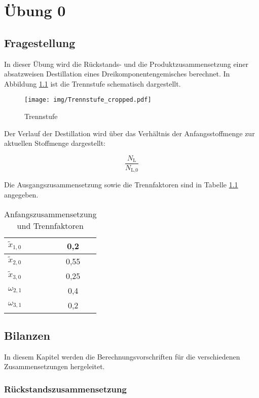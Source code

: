 \chapter{Übung 0}
\setcounter{page}{1}

\section{Fragestellung}
In dieser Übung wird die Rückstands- und die Produktzusammensetzung einer absatzweisen Destillation eines Dreikomponentengemisches berechnet. In Abbildung \ref{fig:Trennstufe} ist die Trennstufe schematisch dargestellt.

\begin{figure}[h]
    \centering
    \texttt{[image: img/Trennstufe\_cropped.pdf]}
         \caption{Trennstufe}
    \label{fig:Trennstufe}
\end{figure}

\noindent Der Verlauf der Destillation wird über das Verhältnis der Anfangsstoffmenge zur aktuellen Stoffmenge dargestellt:

\begin{equation}
 \frac{N_{\text{L}}}{N_{\text{L,0}}}   
\end{equation}

\noindent Die Ausgangszusammensetzung sowie die Trennfaktoren sind in Tabelle \ref{tab:Vorgaben} angegeben.

\begin{table}[h]
    \centering
    \caption{Anfangszusammensetzung und Trennfaktoren} 
    \begin{tabular}{l| c}
      $ \tilde x_{1,0}$ & 0,2 \\ \hline
      $ \tilde x_{2,0}$ & 0,55 \\ \hline
      $ \tilde x_{3,0}$ & 0,25 \\ \hline
      $ \omega_{2,1}$ & 0,4 \\ \hline
      $ \omega_{3,1}$ & 0,2 
        \end{tabular}
    \label{tab:Vorgaben}
\end{table}


\section{Bilanzen}
\label{ch:Bilanz}
In diesem Kapitel werden die Berechnungsvorschriften für die verschiedenen Zusammensetzungen hergeleitet.

\subsection{Rückstandszusammensetzung}

